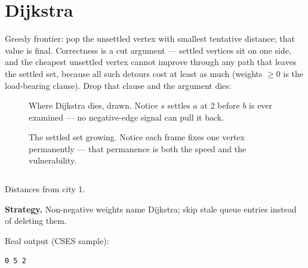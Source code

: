 \section{Dijkstra}\label{sec:dij}
Greedy frontier: pop the unsettled vertex with smallest tentative
distance; that value is final. Correctness is a cut argument ---
settled vertices sit on one side, and the cheapest unsettled vertex
cannot improve through any path that leaves the settled set, because
all such detours cost at least as much (weights $\ge 0$ is the
load-bearing clause). Drop that clause and the argument dies:
\begin{figure}[ht]\centering

\caption{Where Dijkstra dies, drawn. Notice $s$ settles $a$ at 2
before $b$ is ever examined --- no negative-edge signal can pull it
back.}
\label{fig:negfail}
\end{figure}
\begin{figure}[ht]\centering

\caption{The settled set growing. Notice each frame fixes one vertex
permanently --- that permanence is both the speed and the
vulnerability.}
\label{fig:dijset}
\end{figure}
\begin{lstlisting}[language=C++,caption={\texttt{dijkstra.h}: lazy
deletion via the stale-entry skip.},label={lst:dij}]
\end{lstlisting}

\begin{example}\label{ex:routes1}
Distances from city 1.
\par\smallskip
\textbf{Strategy.} Non-negative weights name Dijkstra; skip stale
queue entries instead of deleting them.
\par\smallskip
\begin{solution}

Real output (CSES sample):
\begin{lstlisting}[numbers=none]
0 5 2
\end{lstlisting}
\end{solution}
\end{example}

